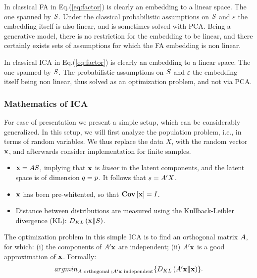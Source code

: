 \documentclass[12pt,a4paper]{article}
\begin{document}
\begin{remark}
	In classical FA in Eq.(\ref{eq:factor}) is clearly an embedding to a linear space. 
	The one spanned by $S$. 
	Under the classical probabilistic assumptions on $S$ and $\varepsilon$ the embedding itself is also linear, and is sometimes solved with PCA. 
	Being a generative model, there is no restriction for the embedding to be linear, and there certainly exists sets of assumptions for which the FA embedding is non linear. 
\end{remark}


\begin{remark}
	In classical ICA in Eq.(\ref{eq:factor}) is clearly an embedding to a linear space. 
	The one spanned by $S$. 
	The probabilistic assumptions on $S$ and $\varepsilon$ the embedding itself being non linear, thus solved as an optimization problem, and not via PCA. 
\end{remark}




\subsubsection{Mathematics of ICA}
For ease of presentation we present a simple setup, which can be considerably generalized. 
In this setup, we will first analyze the population problem, i.e., in terms of random variables. 
We thus replace the data $X$, with the random vector $\mathbf{x}$, and afterwards consider implementation for finite samples. 
\begin{itemize}
	\item $\mathbf{x}=A S$, implying that $\mathbf{x}$ is \emph{linear} in the latent components, and the latent space is of dimension $q=p$. It follows that $s=A'X$.
	\item $\mathbf{x}$ has been pre-whitented, so that $\mathbf{Cov} \left[ \mathbf{x} \right]=I$.
	\item Distance between distributions are measured using the Kullback-Leibler divergence (KL): $D_{KL}\left(\mathbf{x} \Vert S \right)$.
\end{itemize}

The optimization problem in this simple ICA is to find an orthogonal matrix $A$, for which:
(i) the components of $A'\mathbf{x}$ are independent;
(ii) $A'\mathbf{x}$ is a good approximation of $\mathbf{x}$.
Formally: 
\begin{align}
\label{eq:ica_optimization}
\textstyle{\mathop{argmin}_{A\text{ orthogonal} \;; A'\mathbf{x}\text{ independent}}}\{ D_{KL}\left(A'\mathbf{x} \Vert \mathbf{x} \right) \}.
\end{align}
\end{document}
